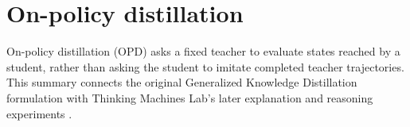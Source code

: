 \section{On-policy distillation}
\label{sec:on-policy-distillation}

On-policy distillation (OPD) asks a fixed teacher to evaluate states reached by a student,
rather than asking the student to imitate completed teacher trajectories. This summary
connects the original Generalized Knowledge Distillation formulation with Thinking
Machines Lab's later explanation and reasoning experiments
\citep{agarwal2024onpolicy,lu2025onpolicydistillation}.







